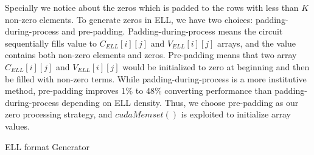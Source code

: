 \documentclass[10pt,journal,compsoc]{IEEEtran}
\begin{document}
Specially we notice about the zeros which is padded to the rows with less than $K$ non-zero elements.
To generate zeros in ELL, we have two choices: padding-during-process and pre-padding. Padding-during-process means the circuit sequentially fills value to $ C_{ELL}[i][j] $ and $ V_{ELL}[i][j] $ arrays, and the value contains both non-zero elements and zeros. Pre-padding means that two array $ C_{ELL}[i][j] $ and $ V_{ELL}[i][j] $ would be initialized to zero at beginning and then be filled with non-zero terms. While padding-during-process is a more institutive method, pre-padding improves 1\% to 48\% converting performance than padding-during-process depending on ELL density. Thus, we choose pre-padding as our zero processing strategy, and $ cudaMemset() $ is exploited to initialize array values.

\begin{algorithm}  [t]
\footnotesize
{}

\caption{ELL format Generator }
\label{alg:ELLFormat}
\end{algorithm}
\end{document}
